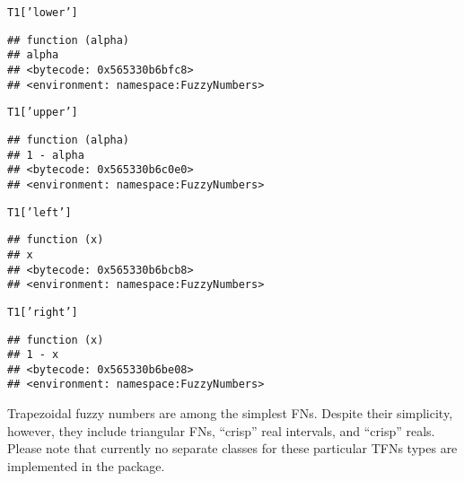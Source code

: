 \documentclass[11pt]{article}\usepackage[]{graphicx}\usepackage[]{color}
\makeatletter
\newcommand{\hlstr}[1]{\textcolor[rgb]{0.192,0.494,0.8}{#1}}%
\newcommand{\hlstd}[1]{\textcolor[rgb]{0.345,0.345,0.345}{#1}}%
\newenvironment{kframe}{%
 \def\at@end@of@kframe{}%
 \ifinner\ifhmode%
  \def\at@end@of@kframe{\end{minipage}}%
  \begin{minipage}{\columnwidth}%
 \fi\fi%
 \def\FrameCommand##1{\hskip\@totalleftmargin \hskip-\fboxsep
 \colorbox{shadecolor}{##1}\hskip-\fboxsep
     \hskip-\linewidth \hskip-\@totalleftmargin \hskip\columnwidth}%
 \MakeFramed {\advance\hsize-\width
   \@totalleftmargin\z@ \linewidth\hsize
   \@setminipage}}%
 {\par\unskip\endMakeFramed%
 \at@end@of@kframe}
\newenvironment{knitrout}{}{} %
\makeatother
\begin{document}
\begin{knitrout}\small
{}\color{fgcolor}\begin{kframe}
\begin{alltt}
\hlstd{T1[}\hlstr{'lower'}\hlstd{]}
\end{alltt}
\begin{verbatim}
## function (alpha) 
## alpha
## <bytecode: 0x565330b6bfc8>
## <environment: namespace:FuzzyNumbers>
\end{verbatim}
\begin{alltt}
\hlstd{T1[}\hlstr{'upper'}\hlstd{]}
\end{alltt}
\begin{verbatim}
## function (alpha) 
## 1 - alpha
## <bytecode: 0x565330b6c0e0>
## <environment: namespace:FuzzyNumbers>
\end{verbatim}
\begin{alltt}
\hlstd{T1[}\hlstr{'left'}\hlstd{]}
\end{alltt}
\begin{verbatim}
## function (x) 
## x
## <bytecode: 0x565330b6bcb8>
## <environment: namespace:FuzzyNumbers>
\end{verbatim}
\begin{alltt}
\hlstd{T1[}\hlstr{'right'}\hlstd{]}
\end{alltt}
\begin{verbatim}
## function (x) 
## 1 - x
## <bytecode: 0x565330b6be08>
## <environment: namespace:FuzzyNumbers>
\end{verbatim}
\end{kframe}
\end{knitrout}



\bigskip
Trapezoidal fuzzy numbers are among the simplest FNs.
Despite their simplicity, however, they include triangular FNs,
``crisp'' real intervals, and ``crisp'' reals.
Please note that currently no separate classes for these particular TFNs types
are implemented in the package.
\end{document}
